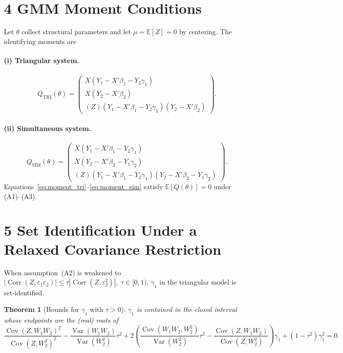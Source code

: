 \documentclass{article}
\newcommand{\E}{\mathbb{E}}
\newcommand{\cov}{\operatorname{Cov}}
\newcommand{\corr}{\operatorname{Corr}}
\newcommand{\var}{\operatorname{Var}}
\theoremstyle{plain}
\newtheorem{theorem}{Theorem}
\begin{document}
\section*{4 \quad GMM Moment Conditions}

Let $\theta$ collect structural parameters and let
$\mu = \E[Z]=0$ by centering.  The identifying moments are

\paragraph{(i) Triangular system.}
\begin{equation}\label{eq:moment_tri}
Q_{\text{TRI}}(\theta) =
  \begin{pmatrix}
    X (Y_1 - X'\beta_1 - Y_2\gamma_1) \\[3pt]
    X (Y_2 - X'\beta_2) \\[3pt]
    (Z)(Y_1 - X'\beta_1 - Y_2\gamma_1)(Y_2 - X'\beta_2)
  \end{pmatrix}.
\end{equation}

\paragraph{(ii) Simultaneous system.}
\begin{equation}\label{eq:moment_sim}
Q_{\text{SIM}}(\theta) =
  \begin{pmatrix}
    X (Y_1 - X'\beta_1 - Y_2\gamma_1) \\[3pt]
    X (Y_2 - X'\beta_2 - Y_1\gamma_2) \\[3pt]
    (Z)(Y_1 - X'\beta_1 - Y_2\gamma_1)(Y_2 - X'\beta_2 - Y_1\gamma_2)
  \end{pmatrix}.
\end{equation}
Equations~\eqref{eq:moment_tri}–\eqref{eq:moment_sim} satisfy
$\E[Q(\theta)]=0$ under (A1)–(A3).

\section*{5 \quad Set Identification Under a Relaxed Covariance Restriction}

When assumption (A2) is weakened to
\(|\corr(Z,\varepsilon_1\varepsilon_2)|
   \le \tau|\corr(Z,\varepsilon_2^2)|,\; \tau\in[0,1)\),
$\gamma_1$ in the triangular model is set‑identified.

\begin{theorem}[Bounds for \(\gamma_1\) with \(\tau>0\)]
\label{thm:bounds}
$\gamma_1$ is contained in the closed interval whose endpoints are the
(real) roots of
\[
\frac{\cov(Z,W_1W_2)^2}{\cov(Z,W_2^2)^2}
-\frac{\var(W_1W_2)}{\var(W_2^2)}\tau^{2}
+2\!\left(
  \frac{\cov(W_1W_2,W_2^{2})}{\var(W_2^{2})}\tau^{2}
  -\frac{\cov(Z,W_1W_2)}{\cov(Z,W_2^{2})}
 \right)\!\gamma_1
 +(1-\tau^{2})\gamma_1^{2}=0.
\]
\end{theorem}
\end{document}

